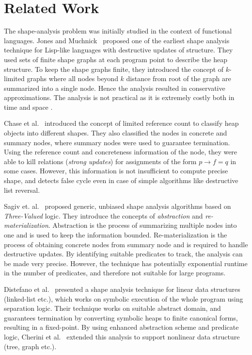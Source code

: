 \documentclass[runningheads,a4paper]{llncs}
\newcommand{\p}{\ensuremath{p}}
\newcommand{\q}{\ensuremath{q}}
\begin{document}
\section{Related Work}\label{sec:bgrel}

The shape-analysis problem was initially studied in the
context of functional languages. Jones and
Muchnick~\cite{Jones79} proposed one of the earliest shape
analysis technique for Lisp-like languages with destructive
updates of structure. They used sets of finite shape graphs
at each program point to describe the heap structure.  To
keep the shape graphs finite, they introduced the concept of
$k$-limited graphs where all nodes beyond $k$ distance from
root of the graph are summarized into a single node. Hence
the analysis resulted in conservative approximations. The
analysis is not practical as it is extremely costly both in
time and space .

Chase et al.~\cite{Chase90} introduced the concept of limited
reference count to classify heap objects into different
shapes. They also classified the nodes in concrete and
summary nodes, where summary nodes were used to guarantee
termination. Using the reference count and concreteness
information of the node, they were able to kill relations
({\em strong updates}) for assignments of the form $\p\rightarrow f = \q$
in some cases. However, this information is not
insufficient to compute precise shape, and detects false
cycle even in case of simple algorithms like destructive list
reversal.

Sagiv et. al.~\cite{Sagiv96,Sagiv99,Sagiv02toplas} proposed
generic, unbiased shape analysis algorithms based on {\em
  Three-Valued} logic. They introduce the concepts of {\em
  abstraction} and {\em re-materialization}. Abstraction is
the process of summarizing multiple nodes into one and is
used to keep the information bounded.  Re-materialization is
the process of obtaining concrete nodes from summary node and
is required to handle destructive updates. By identifying
suitable predicates to track, the analysis can be made very
precise.  However, the technique has potentially exponential
runtime in the number of predicates, and therefore not
suitable for large programs.


Distefano et al.~\cite{distefano06local} presented a shape
analysis technique for linear data structures (linked-list
etc.), which works on symbolic execution of the whole program
using separation logic. Their technique works on suitable
abstract domain, and guarantees termination by converting
symbolic heaps to finite canonical forms, resulting in a
fixed-point. By using enhanced abstraction scheme and
predicate logic, Cherini et al.~\cite{cherini10shape}
extended this analysis to support nonlinear data structure
(tree, graph etc.).
\end{document}
